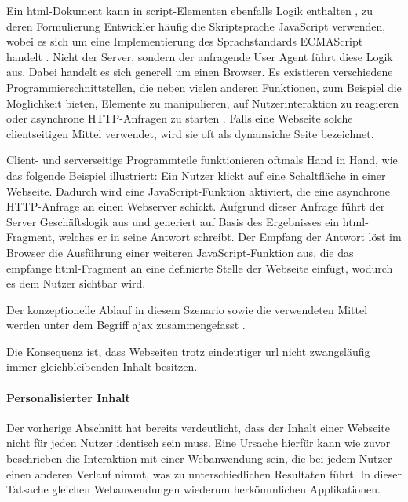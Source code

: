         Ein \gls{html}-Dokument kann in script-Elementen ebenfalls Logik enthalten
        \cite[Kapitel 4.11]{w3c:html5},
        zu deren Formulierung Entwickler häufig die Skriptsprache JavaScript verwenden,
        wobei es sich um eine Implementierung des Sprachstandards ECMAScript handelt
        \cite{ecma:ecmaScript}.
        Nicht der Server, sondern der anfragende User Agent führt diese Logik aus.
        Dabei handelt es sich generell um einen Browser.
        Es existieren verschiedene Programmierschnittstellen,
        die neben vielen anderen Funktionen, zum Beispiel die Möglichkeit bieten,
        Elemente zu manipulieren, auf Nutzerinteraktion zu reagieren
        oder asynchrone HTTP-Anfragen zu starten \cite[Kapitel 8]{whatwg:html}\cite{whatwg:xhr}.
        Falls eine Webseite solche clientseitigen Mittel verwendet,
        wird sie oft als dynamsiche Seite bezeichnet.
        
        Client- und serverseitige Programmteile funktionieren oftmals Hand in Hand,
        wie das folgende Beispiel illustriert:
        Ein Nutzer klickt auf eine Schaltfläche in einer Webseite.
        Dadurch wird eine JavaScript-Funktion aktiviert,
        die eine asynchrone HTTP-Anfrage an einen Webserver schickt.
        Aufgrund dieser Anfrage führt der Server Geschäftslogik aus
        und generiert auf Basis des Ergebnisses ein \gls{html}-Fragment,
        welches er in seine Antwort schreibt.
        Der Empfang der Antwort löst im Browser die Ausführung einer weiteren
        JavaScript-Funktion aus, die das empfange \gls{html}-Fragment
        an eine definierte Stelle der Webseite einfügt,
        wodurch es dem Nutzer sichtbar wird.

        Der konzeptionelle Ablauf in diesem Szenario sowie die verwendeten Mittel
        werden unter dem Begriff \gls{ajax} zusammengefasst \cite{garrett:ajax}.

        Die Konsequenz ist, dass Webseiten trotz eindeutiger \gls{url} nicht zwangsläufig
        immer gleichbleibenden Inhalt besitzen.

        \paragraph*{Personalisierter Inhalt}
        Der vorherige Abschnitt hat bereits verdeutlicht,
        dass der Inhalt einer Webseite nicht für jeden Nutzer identisch sein muss.
        Eine Ursache hierfür kann wie zuvor beschrieben die Interaktion mit
        einer Webanwendung sein, die bei jedem Nutzer einen anderen Verlauf nimmt,
        was zu unterschiedlichen Resultaten führt.
        In dieser Tatsache gleichen Webanwendungen wiederum herkömmlichen Applikationen.

